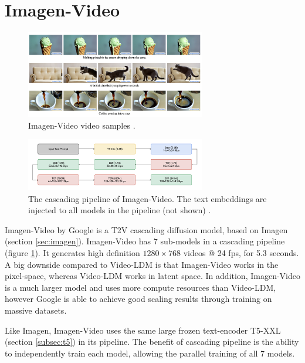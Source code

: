 \section{Imagen-Video}
\label{sec:imagen_video}

\begin{figure}
    \centering
    \includegraphics[width=0.7\textwidth]{images/video_synthesis/imagen_video.png}
    \caption{Imagen-Video video samples \cite{imagen_video}.}
\end{figure}

\begin{figure}
    \centering
    \includegraphics[width=0.7\textwidth]{images/imagen_video/pipeline.png}
    \caption{The cascading pipeline of Imagen-Video. The text embeddings are injected to all models in the pipeline (not shown) \cite{imagen_video}.}
    \label{fig:imagen_video_pipeline}
\end{figure}

Imagen-Video by Google \cite{imagen_video} is a T2V cascading diffusion model, based on Imagen (section \ref{sec:imagen}). Imagen-Video has 7 sub-models in a cascading pipeline (figure \ref{fig:imagen_video_pipeline}). It generates high definition $1280\times 768$ videos @ 24 fps, for 5.3 seconds. A big downside compared to Video-LDM is that Imagen-Video works in the pixel-space, whereas Video-LDM works in latent space. In addition, Imagen-Video is a much larger model and uses more compute resources than Video-LDM, however Google is able to achieve good scaling results through training on massive datasets.

Like Imagen, Imagen-Video uses the same large frozen text-encoder T5-XXL (section \ref{subsec:t5}) in its pipeline. The benefit of cascading pipeline is the ability to independently train each model, allowing the parallel training of all 7 models.

